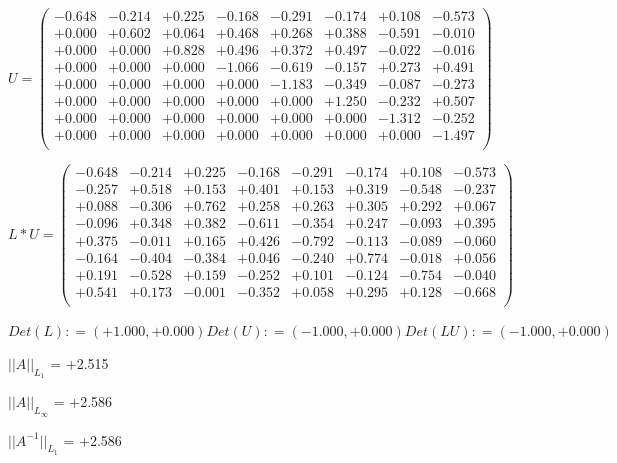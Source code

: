 \documentclass[9pt]{article}
\theoremstyle{plain}
\theoremstyle{definition}
\theoremstyle{remark}
\numberwithin{equation}{section}
\begin{document}
$U = \left(
\begin{array}{
cccccccc}
-0.648 & -0.214 & +0.225 & -0.168 & -0.291 & -0.174 & +0.108 & -0.573 \\
+0.000 & +0.602 & +0.064 & +0.468 & +0.268 & +0.388 & -0.591 & -0.010 \\
+0.000 & +0.000 & +0.828 & +0.496 & +0.372 & +0.497 & -0.022 & -0.016 \\
+0.000 & +0.000 & +0.000 & -1.066 & -0.619 & -0.157 & +0.273 & +0.491 \\
+0.000 & +0.000 & +0.000 & +0.000 & -1.183 & -0.349 & -0.087 & -0.273 \\
+0.000 & +0.000 & +0.000 & +0.000 & +0.000 & +1.250 & -0.232 & +0.507 \\
+0.000 & +0.000 & +0.000 & +0.000 & +0.000 & +0.000 & -1.312 & -0.252 \\
+0.000 & +0.000 & +0.000 & +0.000 & +0.000 & +0.000 & +0.000 & -1.497 \\
\end{array}
\right)$ \newline 

$L * U  = \left(
\begin{array}{
cccccccc}
-0.648 & -0.214 & +0.225 & -0.168 & -0.291 & -0.174 & +0.108 & -0.573 \\
-0.257 & +0.518 & +0.153 & +0.401 & +0.153 & +0.319 & -0.548 & -0.237 \\
+0.088 & -0.306 & +0.762 & +0.258 & +0.263 & +0.305 & +0.292 & +0.067 \\
-0.096 & +0.348 & +0.382 & -0.611 & -0.354 & +0.247 & -0.093 & +0.395 \\
+0.375 & -0.011 & +0.165 & +0.426 & -0.792 & -0.113 & -0.089 & -0.060 \\
-0.164 & -0.404 & -0.384 & +0.046 & -0.240 & +0.774 & -0.018 & +0.056 \\
+0.191 & -0.528 & +0.159 & -0.252 & +0.101 & -0.124 & -0.754 & -0.040 \\
+0.541 & +0.173 & -0.001 & -0.352 & +0.058 & +0.295 & +0.128 & -0.668 \\
\end{array}
\right)$ \newline 

$Det(L) :    = (+1.000,+0.000)     Det(U) :    = (-1.000,+0.000)     Det(LU) :    = (-1.000,+0.000)$

$||A||_{L_1}$  = +2.515

$||A||_{L_{\infty}}$ = +2.586

$||A^{-1}||_{L_1}$  = +2.586
\end{document}
